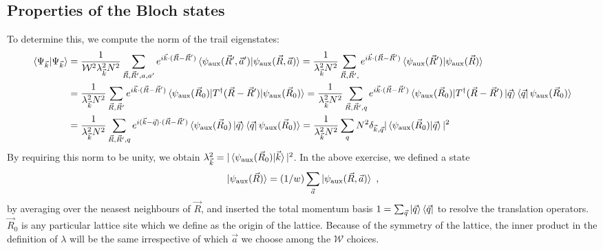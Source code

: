 \documentclass{report}
\numberwithin{equation}{section}
\begin{document}
\begin{appendices}
\chapter{Properties of the Bloch states}
To determine this, we compute the norm of the trail eigenstates:
\begin{equation}\begin{aligned}
	\braket{\Psi_{\vec k} | \Psi_{\vec k}} &= \frac{1}{\mathcal{W}^2 \lambda_{\vec k}^2 N^2}\sum_{\vec R, \vec R^\prime, a, a^\prime}e^{i \vec{k}\cdot(\vec R - \vec R^\prime)}\braket{\psi_\text{aux}(\vec R^\prime, \vec a^\prime) | \psi_\text{aux}(\vec R, \vec a)} = \frac{1}{\lambda_{\vec k}^2 N^2}\sum_{\vec R, \vec R^\prime, }e^{i \vec{k}\cdot(\vec R - \vec R^\prime)}\braket{\psi_\text{aux}(\vec R^\prime) | \psi_\text{aux}(\vec R)}\\
					       &=\frac{1}{\lambda_{\vec k}^2 N^2}\sum_{\vec R, \vec R^\prime}e^{i \vec{k}\cdot(\vec R - \vec R^\prime)}\braket{\psi_\text{aux}(\vec R_0) | T^\dagger(\vec R - \vec R^\prime) | \psi_\text{aux}(\vec R_0)} = \frac{1}{\lambda_{\vec k}^2 N^2}\sum_{\vec R, \vec R^\prime, q}e^{i \vec{k}\cdot(\vec R - \vec R^\prime)}\braket{\psi_\text{aux}(\vec R_0) | T^\dagger(\vec R - \vec R^\prime) \ket{\vec q}\bra{\vec q} \psi_\text{aux}(\vec R_0)}\\
					       &= \frac{1}{\lambda_{\vec k}^2 N^2}\sum_{\vec R, \vec R^\prime, q}e^{i (\vec{k} - \vec q)\cdot(\vec R - \vec R^\prime)}\braket{\psi_\text{aux}(\vec R_0) \ket{\vec q}\bra{\vec q} \psi_\text{aux}(\vec R_0)} = \frac{1}{\lambda_{\vec k}^2 N^2}\sum_{q} N^2 \delta_{\vec{k},\vec q}|\braket{\psi_\text{aux}(\vec R_0) | \vec q}|^2\\
\end{aligned}\end{equation}
By requiring this norm to be unity, we obtain \(\lambda_{\vec k}^2 = |\braket{\psi_\text{aux}(\vec R_0) | \vec k}|^2\). In the above exercise, we defined a state 
\begin{equation}\begin{aligned}\label{zeroth_site_average}
	\ket{\psi_\text{aux}(\vec R)} = (1/w)\sum_{\vec a}\ket{\psi_\text{aux}(\vec R, \vec a)}~,
\end{aligned}\end{equation}
by averaging over the neasest neighbours of \(\vec R\), and inserted the total momentum basis \(1 = \sum_{\vec q}\ket{\vec q}\bra{\vec q}\) to resolve the translation operators. \(\vec R_0\) is any particular lattice site which we define as the origin of the lattice. Because of the symmetry of the lattice, the inner product in the definition of \(\lambda\) will be the same irrespective of which \(\vec a\) we choose among the \(\mathcal{W}\) choices.


\end{appendices}
\end{document}
